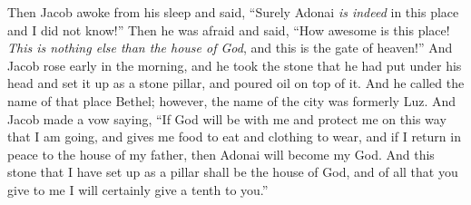 \begin{biblechapter}
\verse Then Jacob awoke from his sleep and said, “Surely Adonai \textit{is indeed} in this place and I did not know!”
\verse Then he was afraid and said, “How awesome is this place! \textit{This is nothing else than the house of God}, and this is the gate of heaven!”
\verse And Jacob rose early in the morning, and he took the stone that he had put under his head and set it up as a stone pillar, and poured oil on top of it.
\verse And he called the name of that place Bethel; however, the name of the city was formerly Luz.
\verse And Jacob made a vow saying, “If God will be with me and protect me on this way that I am going, and gives me food to eat and clothing to wear,
\verse and if I return in peace to the house of my father, then Adonai will become my God.
\verse And this stone that I have set up as a pillar shall be the house of God, and of all that you give to me I will certainly give a tenth to you.”
\end{biblechapter}

